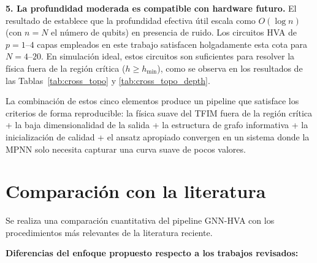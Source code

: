 \documentclass[11pt,a4paper,spanish]{book}
\begin{document}
\textbf{5. La profundidad moderada es compatible con hardware futuro.} El resultado de \citet{mele2026} establece que la profundidad efectiva útil escala como $O(\log n)$ (con $n = N$ el número de qubits) en presencia de ruido. Los circuitos HVA de $p = 1$--$4$ capas empleados en este trabajo satisfacen holgadamente esta cota para $N = 4$--$20$. En simulación ideal, estos circuitos son suficientes para resolver la física fuera de la región crítica ($h \geq h_{\min}$), como se observa en los resultados de las Tablas~\ref{tab:cross_topo} y \ref{tab:cross_topo_depth}.

La combinación de estos cinco elementos produce un pipeline que satisface los criterios de forma reproducible: la física suave del TFIM fuera de la región crítica + la baja dimensionalidad de la salida + la estructura de grafo informativa + la inicialización de calidad + el ansatz apropiado convergen en un sistema donde la MPNN solo necesita capturar una curva suave de pocos valores.



\section{Comparación con la literatura}

Se realiza una comparación cuantitativa del pipeline GNN-HVA con los procedimientos más relevantes de la literatura reciente.

\textbf{Diferencias del enfoque propuesto respecto a los trabajos revisados:}
\end{document}
